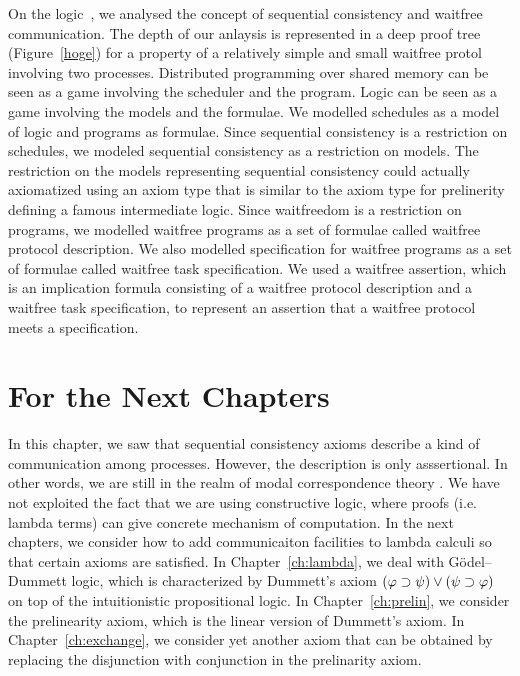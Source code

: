  On the logic~\iec, we analysed the concept of sequential consistency and waitfree
 communication.
 The depth of our anlaysis is represented in a deep proof tree (Figure~\ref{hoge}) for a
 property of a relatively simple and small waitfree protol involving two processes.
 Distributed programming over shared memory can be seen as a game involving the scheduler
 and the program.
 Logic can be seen as a game involving the models and the formulae.
 We modelled schedules as a model of logic and programs as formulae.
 Since sequential consistency is a restriction on schedules,
 we modeled sequential consistency as a restriction on models.
 The restriction on the models representing sequential consistency could actually
 axiomatized using an axiom type that is similar to the axiom type for prelinerity defining
 a famous intermediate logic.
 Since waitfreedom is a restriction on programs,
 we modelled waitfree programs as a set of formulae called waitfree protocol description.
 We also modelled specification for waitfree programs as a set of formulae called waitfree
 task specification.
 We used a waitfree assertion, which is
 an implication formula consisting of a waitfree protocol description and a
 waitfree task specification,
 to represent
 an assertion that a waitfree protocol meets a specification.

\section{For the Next Chapters}

In this chapter, we saw that sequential consistency axioms
describe a kind of communication among processes.
However, the description is only asssertional.  In other words, we are
still in the realm of modal correspondence theory .
We have not exploited the fact that we are using constructive logic,
where proofs (i.e. lambda terms) can give concrete mechanism of
computation.  In the next chapters, we consider how to add communicaiton
facilities to lambda calculi so that certain axioms are satisfied.
In Chapter~\ref{ch:lambda}, we deal with G\"odel--Dummett logic, which is
characterized by Dummett's axiom $(\varphi\supset\psi)\lor (\psi\supset\varphi)$ on
top of the intuitionistic propositional logic.
In Chapter~\ref{ch:prelin}, we consider the prelinearity axiom, which is
the linear version of Dummett's axiom.
In Chapter~\ref{ch:exchange}, we consider yet another axiom that can be
obtained by replacing the disjunction with conjunction in the
prelinarity axiom.
